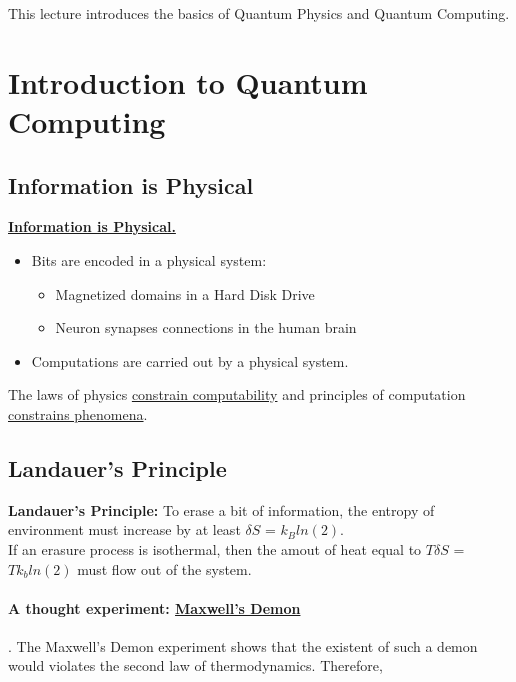 \documentclass[12pt]{article}
\begin{document}
	\MakeScribeTop


This lecture introduces the basics of Quantum Physics and Quantum Computing.

\section{Introduction to Quantum Computing}

\subsection{Information is Physical} 

\textbf{\color{Orchid} \underline{Information is Physical.}} 
\begin{itemize}
    \item Bits are encoded in a physical system:
    \begin{itemize}
        \item Magnetized domains in a Hard Disk Drive
        \item Neuron synapses connections in the human brain
    \end{itemize}
    \item Computations are carried out by a physical system.
\end{itemize}

The laws of physics \underline{constrain computability} and principles of computation \underline{constrains phenomena}.


\subsection{Landauer's Principle} 

\textbf{Landauer's Principle:} To erase a bit of information, the entropy of environment must increase by at least $\delta S$ = $k_Bln(2)$. \\

\noindent
If an erasure process is isothermal, then the amout of heat equal to $T\delta S$ = $Tk_bln(2)$ must flow out of the system.

\paragraph{A thought experiment: \href{https://en.wikipedia.org/wiki/Maxwell's_demon}{Maxwell's Demon}}. The Maxwell's Demon experiment shows that the existent of such a demon would violates the second law of thermodynamics. Therefore,
\end{document}

